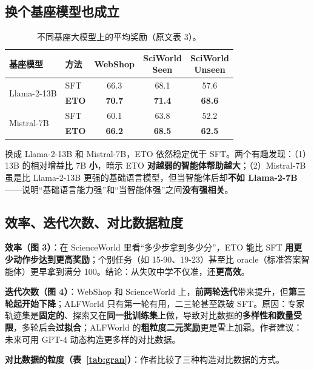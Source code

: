 \documentclass[11pt,UTF8,fontset=fandol]{ctexart}
\begin{document}
\subsection{换个基座模型也成立}

\begin{table}[H]\centering
\caption{不同基座大模型上的平均奖励（原文表 3）。}
\label{tab:llms}
\begin{tabular}{llccc}
\toprule
基座模型 & 方法 & WebShop & \makecell{SciWorld\\Seen} & \makecell{SciWorld\\Unseen} \\
\midrule
\multirow{2}{*}{Llama-2-13B} & SFT & 66.3 & 68.1 & 57.6 \\
                             & \textbf{ETO} & \textbf{70.7} & \textbf{71.4} & \textbf{68.6} \\
\midrule
\multirow{2}{*}{Mistral-7B}  & SFT & 60.1 & 63.8 & 52.2 \\
                             & \textbf{ETO} & \textbf{66.2} & \textbf{68.5} & \textbf{62.5} \\
\bottomrule
\end{tabular}
\end{table}

换成 Llama-2-13B 和 Mistral-7B，ETO 依然稳定优于 SFT。两个有趣发现：（1）13B 的相对增益比 7B \textbf{小}，暗示 ETO \textbf{对越弱的智能体帮助越大}；（2）Mistral-7B 虽是比 Llama-2-13B 更强的基础语言模型，但当智能体后却\textbf{不如 Llama-2-7B}——说明“基础语言能力强”和“当智能体强”之间\textbf{没有强相关}。

\subsection{效率、迭代次数、对比数据粒度}

\textbf{效率（图 3）}：在 ScienceWorld 里看“多少步拿到多少分”，ETO 能比 SFT \textbf{用更少动作步达到更高奖励}；个别任务（如 15-90、19-23）甚至比 oracle（标准答案智能体）更早拿到满分 100。结论：从失败中学不仅准，还\textbf{更高效}。

\textbf{迭代次数（图 4）}：WebShop 和 ScienceWorld 上，\textbf{前两轮迭代}带来提升，但\textbf{第三轮起开始下降}；ALFWorld 只有第一轮有用，二三轮甚至跌破 SFT。原因：专家轨迹集是\textbf{固定的}、探索又在\textbf{同一批训练集}上做，导致对比数据的\textbf{多样性和数量受限}，多轮后会\textbf{过拟合}；ALFWorld 的\textbf{粗粒度二元奖励}更是雪上加霜。作者建议：未来可用 GPT-4 动态构造更多样的对比数据。

\textbf{对比数据的粒度（表~\ref{tab:gran}）}：作者比较了三种构造对比数据的方式。
\end{document}
